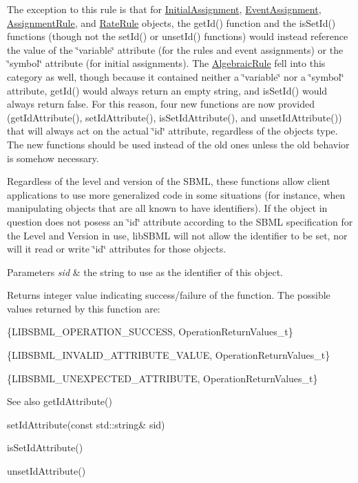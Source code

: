 The exception to this rule is that for \hyperlink{class_initial_assignment}{Initial\+Assignment}, \hyperlink{class_event_assignment}{Event\+Assignment}, \hyperlink{class_assignment_rule}{Assignment\+Rule}, and \hyperlink{class_rate_rule}{Rate\+Rule} objects, the get\+Id() function and the is\+Set\+Id() functions (though not the set\+Id() or unset\+Id() functions) would instead reference the value of the \char`\"{}variable\char`\"{} attribute (for the rules and event assignments) or the \char`\"{}symbol\char`\"{} attribute (for initial assignments). The \hyperlink{class_algebraic_rule}{Algebraic\+Rule} fell into this category as well, though because it contained neither a \char`\"{}variable\char`\"{} nor a \char`\"{}symbol\char`\"{} attribute, get\+Id() would always return an empty string, and is\+Set\+Id() would always return {\ttfamily false}. For this reason, four new functions are now provided (get\+Id\+Attribute(), set\+Id\+Attribute(), is\+Set\+Id\+Attribute(), and unset\+Id\+Attribute()) that will always act on the actual \char`\"{}id\char`\"{} attribute, regardless of the object\textquotesingle{}s type. The new functions should be used instead of the old ones unless the old behavior is somehow necessary.

Regardless of the level and version of the S\+B\+ML, these functions allow client applications to use more generalized code in some situations (for instance, when manipulating objects that are all known to have identifiers). If the object in question does not posess an \char`\"{}id\char`\"{} attribute according to the S\+B\+ML specification for the Level and Version in use, lib\+S\+B\+ML will not allow the identifier to be set, nor will it read or write \char`\"{}id\char`\"{} attributes for those objects.


\begin{DoxyParams}{Parameters}
{\em sid} & the string to use as the identifier of this object.\\
\hline
\end{DoxyParams}
\begin{DoxyReturn}{Returns}
integer value indicating success/failure of the function. The possible values returned by this function are\+: \begin{DoxyItemize}
\item \{L\+I\+B\+S\+B\+M\+L\+\_\+\+O\+P\+E\+R\+A\+T\+I\+O\+N\+\_\+\+S\+U\+C\+C\+E\+SS, Operation\+Return\+Values\+\_\+t\} \item \{L\+I\+B\+S\+B\+M\+L\+\_\+\+I\+N\+V\+A\+L\+I\+D\+\_\+\+A\+T\+T\+R\+I\+B\+U\+T\+E\+\_\+\+V\+A\+L\+UE, Operation\+Return\+Values\+\_\+t\} \item \{L\+I\+B\+S\+B\+M\+L\+\_\+\+U\+N\+E\+X\+P\+E\+C\+T\+E\+D\+\_\+\+A\+T\+T\+R\+I\+B\+U\+TE, Operation\+Return\+Values\+\_\+t\}\end{DoxyItemize}

\end{DoxyReturn}
\begin{DoxySeeAlso}{See also}
get\+Id\+Attribute() 

set\+Id\+Attribute(const std\+::string\& sid) 

is\+Set\+Id\+Attribute() 

unset\+Id\+Attribute() 
\end{DoxySeeAlso}


